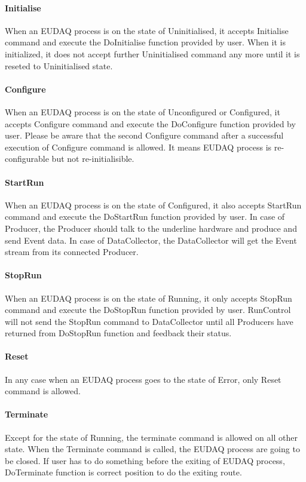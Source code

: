 \paragraph{Initialise}
When an EUDAQ process is on the state of Uninitialised, it accepts Initialise command and execute the DoInitialise function provided by user. When it is initialized, it does not accept further Uninitialised command any more until it is reseted to Uninitialised state.

\paragraph{Configure}
When an EUDAQ process is on the state of Unconfigured or Configured, it accepts Configure command and execute the DoConfigure function provided by user. Please be aware that the second Configure command after a successful execution of Configure command is allowed. It means EUDAQ process is re-configurable but not re-initialisible.

\paragraph{StartRun}
When an EUDAQ process is on the state of Configured, it also accepts StartRun command and execute the DoStartRun function provided by user. In case of Producer, the Producer should talk to the underline hardware and produce and send Event data. In case of DataCollector, the DataCollector will get the Event stream from its connected Producer.

\paragraph{StopRun}
When an EUDAQ process is on the state of Running, it only accepts StopRun command and execute the DoStopRun function provided by user. RunControl will not send the StopRun command to DataCollector until all Producers have returned from DoStopRun function and feedback their status.

\paragraph{Reset}
In any case when an EUDAQ process goes to the state of Error, only Reset command is allowed.

\paragraph{Terminate}
Except for the state of Running, the terminate command is allowed on all other state. When the Terminate command is called, the EUDAQ process are going to be closed. If user has to do something before the exiting of EUDAQ process, DoTerminate function is correct position to do the exiting route.

